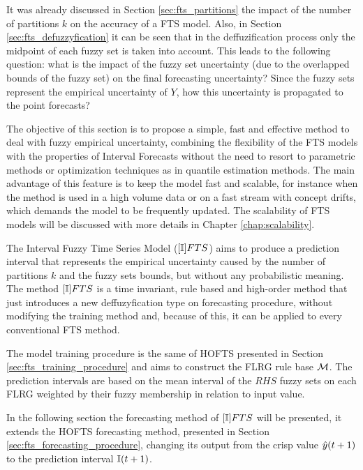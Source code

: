 It was already discussed in Section \ref{sec:fts_partitions} the impact of the number of partitions $k$ on the accuracy of a FTS model. Also, in Section \ref{sec:fts_defuzzyfication} it can be seen that in the deffuzification process only the midpoint of each fuzzy set is taken into account. This leads to the following question: what is the impact of the fuzzy set uncertainty (due to the overlapped bounds of the fuzzy set) on the final forecasting uncertainty? Since  the fuzzy sets represent the empirical uncertainty of $Y$, how this uncertainty is propagated to the point forecasts?

The objective of this section is to propose a simple, fast and effective method to deal with fuzzy empirical uncertainty, combining the flexibility of the FTS models with the properties of Interval Forecasts without the need to resort to parametric methods or optimization techniques as in quantile estimation methods. The main advantage of this feature is to keep the model fast and scalable, for instance when the method is used in a high volume data or on a fast stream with concept drifts, which demands the model to be frequently updated. The scalability of FTS models will be discussed with more details in Chapter \ref{chap:scalability}.

The Interval Fuzzy Time Series Model ($[\mathbb{I}]FTS$) aims to produce a prediction interval that represents the empirical uncertainty caused by the number of partitions $k$ and the fuzzy sets bounds, but without any probabilistic meaning. The method $[\mathbb{I}]FTS$ is a time invariant, rule based and high-order method that just  introduces a new deffuzyfication type on forecasting procedure, without modifying the training method and, because of this, it can be applied to every conventional FTS method.  

The model training procedure is the same of HOFTS presented in Section \ref{sec:fts_training_procedure} and aims to construct the FLRG rule base $\mathcal{M}$. The prediction intervals are based on the mean interval of the $RHS$ fuzzy sets on each FLRG weighted by their fuzzy membership in relation to input value.

In the following section the forecasting method of $[\mathbb{I}]FTS$ will be presented, it extends the HOFTS forecasting method, presented in Section \ref{sec:fts_forecasting_procedure}, changing its output from the crisp value $\hat{y}(t+1)$ to the prediction interval $\mathbb{I}(t+1)$.

%
